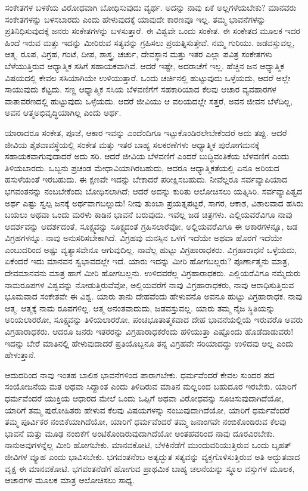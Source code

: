 ಸಂಕೇತಗಳ ಬಳಕೆಯ ವಿರೋಧವಾಗಿ ಬೋಧಿಸುವುದು ವ್ಯರ್ಥ. ಅದನ್ನು ನಾವು ಏಕೆ ಅಲ್ಲಗಳೆಯಬೇಕು? ಮಾನವರು ಸಂಕೇತಗಳನ್ನು ಬಳಸಬಾರದು ಎಂದು ಹೇಳುವುದಕ್ಕೆ ಯಾವುದೇ ಕಾರಣವೂ ಇಲ್ಲ. ತಮ್ಮ ಭಾವನೆಗಳನ್ನು ಪ್ರತಿನಿಧಿಸುವುದಕ್ಕೆ ಜನರು ಸಂಕೇತಗಳನ್ನು ಬಳಸುತ್ತಾರೆ. ಈ ವಿಶ್ವವೇ ಒಂದು ಸಂಕೇತ. ಈ ಸಂಕೇತದ ಮೂಲಕ ಇದರ ಹಿಂದೆ ಇರುವ ಮತ್ತು ಇದನ್ನು ಮೀರಿರುವ ಸತ್ಯವನ್ನು ಗ್ರಹಿಸಲು ಪ್ರಯತ್ನಿಸುತ್ತೇವೆ. ನಮ್ಮ ಗುರಿಯು. ಜಡವಸ್ತುವಲ್ಲ, ಆತ್ಮ. ರೂಪ, ವಿಗ್ರಹ, ಗಂಟೆ, ದೀಪ, ಶಾಸ್ತ್ರ, ಚರ್ಚು, ದೇವಸ್ಥಾನ ಮತ್ತು ಇತರ ಎಲ್ಲಾ ಪವಿತ್ರ ಸಂಕೇತಗಳು ಬೆಳೆಯುತ್ತಿರುವ ಆಧ್ಯಾತ್ಮಿಕ ಸಸಿಗೆ ಸಹಾಯಕವಾಗಿವೆ. ಆದರೆ ಇಷ್ಟೇ, ಅದರಾಚೆಗೆ ಇಲ್ಲ. ಹೆಚ್ಚಿನ ಜನ ಆಧ್ಯಾತ್ಮಿಕ ವಿಷಯದಲ್ಲಿ ಕೇವಲ ಸಸಿಯಾಗಿಯೇ ಉಳಿಯುತ್ತಾರೆ. ಒಂದು ಚರ್ಚಿನಲ್ಲಿ ಹುಟ್ಟುವುದು ಒಳ್ಳೆಯದು, ಆದರೆ ಅಲ್ಲೇ ಸಾಯುವುದು ಕೆಟ್ಟದು. ಸಣ್ಣ ಆಧ್ಯಾತ್ಮಿಕ ಸಸಿಯ ಬೆಳವಣಿಗೆಗೆ ಸಹಕಾರಿಯಾದ ಕೆಲವು ಆಚಾರ ವ್ಯವಹಾರಗಳ ವಾತಾವರಣದಲ್ಲಿ ಹುಟ್ಟುವುದು ಒಳ್ಳೆಯದು. ಆದರೆ ಜೀವಿಯು ಆ ವಲಯದಲ್ಲೇ ಸತ್ತರೆ, ಅವನ ಜೀವನ ಬೆಳೆದಿಲ್ಲ, ಅವನ ಆತ್ಮ\break ಅಭಿವೃದ್ಧಿಯಾಗಿಲ್ಲ ಎಂದು ಅರ್ಥ.

ಯಾರಾದರೂ ಸಂಕೇತ, ಪೂಜೆ, ಆಕಾರ ಇವನ್ನು ಎಂದೆಂದಿಗೂ ಇಟ್ಟುಕೊಂಡಿರಲೇ\-ಬೇಕೆಂದರೆ ಅದು ತಪ್ಪು. ಆದರೆ ಜೀವಿಯ ಶೈಶವಾವಸ್ಥೆಯಲ್ಲಿ ಸಂಕೇತ ಮತ್ತು ಇತರ ಬಾಹ್ಯ ಸಲಕರಣೆಗಳು ಆಧ್ಯಾತ್ಮಿಕ ಪುರೋಗಮನಕ್ಕೆ ಸಹಾಯಕವಾಗುವುದಾದರೆ ಅದು ಸರಿ. ಆದರೆ ಜೀವಿಯ ಬೆಳವಣಿಗೆ ಎಂದರೆ ಬುದ್ಧಿವಂತಿಕೆಯ ಬೆಳವಣಿಗೆ ಎಂದು ತಿಳಿಯ\-ಬಾರದು. ಒಬ್ಬನು ಪ್ರಚಂಡ ಮೇಧಾವಿಯಾಗಿರಬಹುದು, ಆದರೂ ಆಧ್ಯಾತ್ಮಿಕತೆಯಲ್ಲಿ ಏನೂ ಅರಿಯದ ಹಸುಳೆಯಂತೆ ಇರಬಹುದು. ಈ ಕ್ಷಣವೇ ಇದನ್ನು ಬೇಕಾದರೆ ಪರೀಕ್ಷಿಸಬಹುದು. ನೀವೆಲ್ಲರೂ ಸರ್ವವ್ಯಾಪಿಯಾದ ಭಗವಂತನನ್ನು ನಂಬಬೇಕೆಂದು ಬೋಧಿಸಲಾಗಿದೆ; ಆದರೆ ಅದನ್ನು ಕುರಿತು ಆಲೋಚಿಸಲು ಯತ್ನಿಸಿರಿ. ಸರ್ವವ್ಯಾಪಿತ್ವದ ಅರ್ಥ ಎಷ್ಟು ಸ್ವಲ್ಪ ಜನಕ್ಕೆ ಅರ್ಥವಾಗಬಲ್ಲುದು! ನೀವು ತುಂಬಾ ಪ್ರಯತ್ನಪಟ್ಟರೆ, ಸಾಗರ, ಆಕಾಶ, ವಿಶಾಲವಾದ ಹಸಿರು ಬಯಲು ಅಥವಾ ಒಂದು ಮರಳು ಕಾಡಿನ ಭಾವನೆ ಬರುವುದು. ಇವೆಲ್ಲ ಜಡ ಚಿತ್ರಗಳು. ಎಲ್ಲಿಯವರೆವಿಗೂ ನಾವು ಆದರ್ಶವನ್ನು ಆದರ್ಶದಂತೆ, ಸೂಕ್ಷ್ಮವನ್ನು ಸೂಕ್ಷ್ಮದಂತೆ ಗ್ರಹಿಸಲಾರೆವೋ, ಅಲ್ಲಿಯವರೆವಿಗೂ ಈ ಆಕಾರಗಳನ್ನೂ, ಜಡ ವಿಗ್ರಹಗಳನ್ನೂ. ನಾವು ಅನುಸರಿಸಬೇಕಾಗಿದೆ. ವಿಗ್ರಹವು ಮನಸ್ಸಿನ ಒಳಗೆ ಇದೆಯೇ ಅಥವಾ ಹೊರಗೆ ಇದೆಯೇ ಎಂಬುದರಿಂದ ಅಷ್ಟು ವ್ಯತ್ಯಾಸವೇನೂ ಆಗುವುದಿಲ್ಲ. ನಾವೆಲ್ಲ ಹುಟ್ಟು ವಿಗ್ರಹಾರಾಧಕರು. ವಿಗ್ರಹಾರಾಧನೆ ಒಳ್ಳೆಯದು, ಏಕೆಂದರೆ ಇದು ಮಾನವನ ಸ್ವಭಾವದಲ್ಲೇ ಇದೆ. ಯಾರು ಇದನ್ನು ಮೀರಿ ಹೋಗಬಲ್ಲರು? ಪೂರ್ಣಾತ್ಮನು ಮಾತ್ರ, ದೇವಮಾನವನು ಮಾತ್ರ ಹಾಗೆ ಮೀರಿ ಹೋಗಬಲ್ಲನು. ಉಳಿದವರೆಲ್ಲ ವಿಗ್ರಹಾರಾಧಕರು. ಎಲ್ಲಿಯರೆವಿಗೂ ನಮ್ಮೆದುರು ನಾಮರೂಪಗಳ ವಿಶ್ವವನ್ನು ನೋಡುತ್ತಿರುವೆವೋ, ಅಲ್ಲಿಯವರೆಗೆ ನಾವು ವಿಗ್ರಹಾರಾಧಕರು, ನಾವು ಆರಾಧಿಸುತ್ತಿರುವ ಭೂಮವಾದ ಸಂಕೇತವೇ ಈ ವಿಶ್ವ. ಯಾರು ತಾನು ದೇಹವೆಂದು ಹೇಳುವನೊ ಅವನೂ ಹುಟ್ಟು ವಿಗ್ರಹಾರಾಧಕ. ನಾವು ಆತ್ಮ. ಆತ್ಮಕ್ಕೆ ನಾಮ ರೂಪಗಳಿಲ್ಲ. ಆತ್ಮ ಅನಂತವಾದುದು, ಜಡವಸ್ತುವಲ್ಲ. ಯಾರು ತಮ್ಮ ನೈಜ ಸ್ಥಿತಿಯನ್ನು ಅರಿಯಲಾರರೋ, ಸೂಕ್ಷ್ಮವನ್ನು ತಿಳಿಯಲಾರರೋ, ಪಂಚಭೂತಾತ್ಮಕವಾದ ದೇಹ ಭಾವನೆಯಲ್ಲಿಯೆ ಇರುವರೊ ಅವರು ವಿಗ್ರಹಾರಾಧಕರು. ಆದರೂ ಜನರು ಇತರರನ್ನು ವಿಗ್ರಹಾರಾಧಕರೆಂದು ಹಳಿಯುತ್ತಾ ಎಷ್ಟೊಂದು ಹೊಡೆದಾಡುವರು! ಇದನ್ನು ಬೇರೆ ಮಾತಿನಲ್ಲಿ ಹೇಳುವುದಾದರೆ ಪ್ರತಿಯೊಬ್ಬನೂ ತನ್ನ ವಿಗ್ರಹವೇ ಸರಿಯಾದದ್ದು ಉಳಿದವು ಅಲ್ಲ ಎಂದು ಹೇಳುತ್ತಾನೆ.

ಆದುದರಿಂದ ನಾವು ಇಂತಹ ಬಾಲಿಶ ಭಾವನೆಗಳಿಂದ ಪಾರಾಗಬೇಕು. ಧರ್ಮವೆಂದರೆ ಕೇವಲ ಸುಂದರ ಪದ ಸಂಯೋಜನೆಯ ಮತ ಅಥವಾ ಸಿದ್ದಾಂತ ಎಂದು ತಿಳಿದಿರುವ ಮಾತಿನ ಮಲ್ಲರಿಂದ ಬಹುದೂರ ಇರಬೇಕು. ಯಾರಿಗೆ ಧರ್ಮವೆಂದರೆ ಯುಕ್ತಿಯ ಆಧಾರದ ಮೇಲೆ ಒಂದು ಒಪ್ಪಿಗೆ ಅಥವಾ ವಿರೋಧವನ್ನು ಸೂಚಿಸುವುದಾಗಿದೆಯೋ, ಯಾರಿಗೆ ತಮ್ಮ ಪುರೋಹಿತರು ಹೇಳುವ ಕೆಲವು ವಿಷಯಗಳನ್ನು ನಂಬುವುದಾಗಿದೆಯೋ, ಯಾರಿಗೆ ಧರ್ಮವೆಂದರೆ ತಮ್ಮ ಪೂರ್ವಿಕರ ನಂಬಿಕೆಯಾಗಿದೆಯೋ, ಯಾರಿಗೆ ಧರ್ಮವೆಂದರೆ ತಮ್ಮ ಜನಾಂಗವೇ ನಂಬಿಕೊಂಡಿರುವ ಕೆಲವು ಭಾವನೆ ಮತ್ತು ಮೂಢ ನಂಬಿಕೆಗೆ ಅಂಟಿಕೊಂಡಿರುವುದಾಗಿದೆಯೋ ಅಂತಹವರಿಂದ ನಾವು ದೂರವಿರಬೇಕು. ನಾನು\break ಅವುಗಳನ್ನೆಲ್ಲ ಮೀರಿ ಹೋಗಬೇಕು. ಮಾನವಕೋಟಿ, ಬೆಳಕಿನೆಡೆಗೆ ಮುಂದುವರಿಯು\-ತ್ತಿರುವ ಒಂದು ಬೃಹತ್​ ಜೀವಿಗಳ ವ್ಯೂಹ ಎಂದು ಭಾವಿಸಬೇಕು. ಭಗವಂತನೆಂಬ ಅತ್ಯದ್ಭುತ ಸತ್ಯವನ್ನು ವ್ಯಕ್ತಗೊಳಿಸುತ್ತಿರುವ ಅತಿ ಅದ್ಭುತವಾದ ವೃಕ್ಷ ಈ ಮಾನವಕೋಟಿ. ಭಗವಂತನೆಡೆಗೆ ಹೋಗುವ ಪ್ರಾಥಮಿಕ ಬಾಹ್ಯ ಚಲನೆಯನ್ನು ಸ್ಥೂಲ ವಸ್ತುಗಳ ಮೂಲಕ, ಆಚಾರಗಳ ಮೂಲಕ ಮಾತ್ರ ಆಲೋಚಿಸಲು ಸಾಧ್ಯ.

